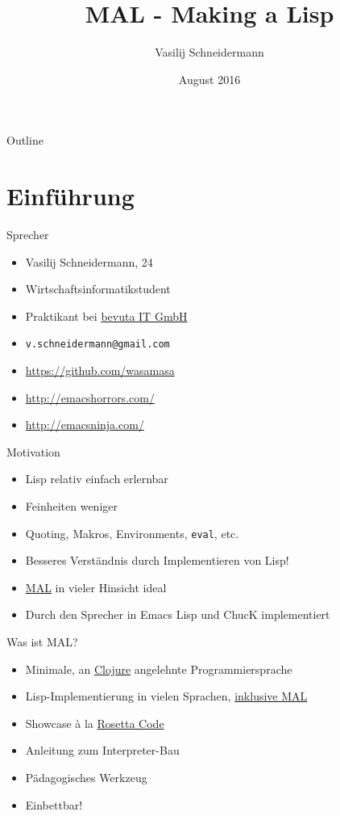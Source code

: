 \documentclass[presentation]{beamer}
\author{Vasilij Schneidermann}
\date{August 2016}
\title{MAL - Making a Lisp}
\begin{document}
\maketitle
\begin{frame}{Outline}
\tableofcontents
\end{frame}

\AtBeginSection{\frame{\sectionpage}}

\section{Einführung}
\label{sec-1}

\begin{frame}[label=sec-1-1]{Sprecher}
\begin{itemize}
\item Vasilij Schneidermann, 24
\item Wirtschaftsinformatikstudent
\item Praktikant bei \href{https://www.bevuta.com/en/}{bevuta IT GmbH}
\item \texttt{v.schneidermann@gmail.com}
\item \url{https://github.com/wasamasa}
\item \url{http://emacshorrors.com/}
\item \url{http://emacsninja.com/}
\end{itemize}
\end{frame}

\begin{frame}[fragile,label=sec-1-2]{Motivation}
 \begin{itemize}
\item Lisp relativ einfach erlernbar
\item Feinheiten weniger
\item Quoting, Makros, Environments, \texttt{eval}, etc.
\item Besseres Verständnis durch Implementieren von Lisp!
\item \href{https://github.com/kanaka/mal}{MAL} in vieler Hinsicht ideal
\item Durch den Sprecher in Emacs Lisp und ChucK implementiert
\end{itemize}
\end{frame}

\begin{frame}[label=sec-1-3]{Was ist MAL?}
\begin{itemize}
\item Minimale, an \href{http://clojure.org/}{Clojure} angelehnte Programmiersprache
\item Lisp-Implementierung in vielen Sprachen, \href{https://en.wikipedia.org/wiki/Meta-circular_evaluator}{inklusive MAL}
\item Showcase à la \href{http://rosettacode.org/wiki/Rosetta_Code}{Rosetta Code}
\item Anleitung zum Interpreter-Bau
\item Pädagogisches Werkzeug
\item Einbettbar!
\end{itemize}
\end{frame}
\end{document}
